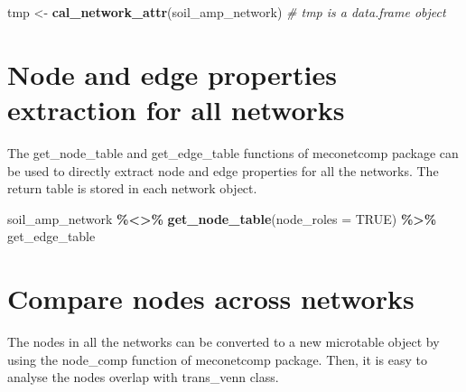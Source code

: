 \documentclass[
]{book}
\newenvironment{Shaded}{\begin{snugshade}}{\end{snugshade}}
\newcommand{\AttributeTok}[1]{\textcolor[rgb]{0.13,0.29,0.53}{#1}}
\newcommand{\CommentTok}[1]{\textcolor[rgb]{0.56,0.35,0.01}{\textit{#1}}}
\newcommand{\ConstantTok}[1]{\textcolor[rgb]{0.56,0.35,0.01}{#1}}
\newcommand{\FunctionTok}[1]{\textcolor[rgb]{0.13,0.29,0.53}{\textbf{#1}}}
\newcommand{\NormalTok}[1]{#1}
\newcommand{\OtherTok}[1]{\textcolor[rgb]{0.56,0.35,0.01}{#1}}
\newcommand{\SpecialCharTok}[1]{\textcolor[rgb]{0.81,0.36,0.00}{\textbf{#1}}}
\begin{document}
\begin{Shaded}
\begin{Highlighting}[]
\NormalTok{tmp }\OtherTok{\textless{}{-}} \FunctionTok{cal\_network\_attr}\NormalTok{(soil\_amp\_network)}
\CommentTok{\# tmp is a data.frame object}
\end{Highlighting}
\end{Shaded}

\section{Node and edge properties extraction for all networks}\label{node-and-edge-properties-extraction-for-all-networks}

The get\_node\_table and get\_edge\_table functions of meconetcomp package can be used to directly extract node and edge properties for all the networks.
The return table is stored in each network object.

\begin{Shaded}
\begin{Highlighting}[]
\NormalTok{soil\_amp\_network }\SpecialCharTok{\%\textless{}\textgreater{}\%} \FunctionTok{get\_node\_table}\NormalTok{(}\AttributeTok{node\_roles =} \ConstantTok{TRUE}\NormalTok{) }\SpecialCharTok{\%\textgreater{}\%}\NormalTok{ get\_edge\_table}
\end{Highlighting}
\end{Shaded}

\section{Compare nodes across networks}\label{compare-nodes-across-networks}

The nodes in all the networks can be converted to a new microtable object by using the node\_comp function of meconetcomp package.
Then, it is easy to analyse the nodes overlap with trans\_venn class.
\end{document}
